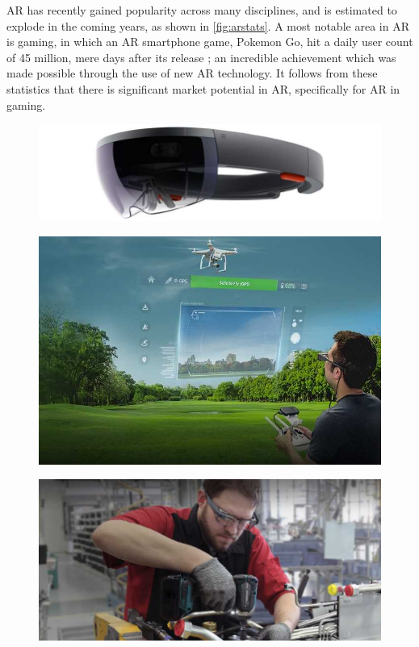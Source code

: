 AR has recently gained popularity across many disciplines, and is estimated to explode in the coming years, as shown in \cref{fig:arstats}. A most notable area in AR is gaming, in which an AR smartphone game, Pokemon Go, hit a daily user count of 45 million, mere days after its release \citep{pokemongo}; an incredible achievement which was made possible through the use of new AR technology. It follows from these statistics that there is significant market potential in AR, specifically for AR in gaming.

\begin{figure}[ht]
\begin{minipage}{\textwidth}
\centering
\begin{minipage}{0.3\textwidth}
    \includegraphics[width=\textwidth]{images/proposal/microsoft-hololens}
    \label{fig:hololens}
\end{minipage}\hfill
\begin{minipage}{0.3\textwidth}
    \includegraphics[width=\textwidth]{images/proposal/moverio-smart-glasses-2}
    \label{fig:epson}
\end{minipage}\hfill
\begin{minipage}{0.3\textwidth}
    \includegraphics[width=\textwidth]{images/proposal/google-glass}

\end{minipage}
\end{minipage}
\end{figure}
